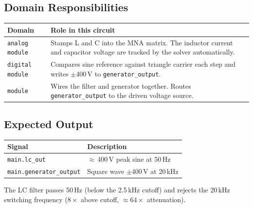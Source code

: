 \documentclass[11pt, a4paper]{article}
\newcommand{\code}[1]{\texttt{\small #1}}
\begin{document}
\subsection*{Domain Responsibilities}

\begin{center}
\begin{tabular}{@{} L{3.5cm} L{9cm} @{}}
  \toprule
  \textbf{Domain} & \textbf{Role in this circuit} \\
  \midrule
  \code{analog module}  & Stamps L and C into the MNA matrix. The
                          inductor current and capacitor voltage are
                          tracked by the solver automatically. \\
  \code{digital module} & Compares sine reference against triangle
                          carrier each step and writes $\pm$400\,V to
                          \code{generator\_output}. \\
  \code{module}         & Wires the filter and generator together.
                          Routes \code{generator\_output} to the driven
                          voltage source. \\
  \bottomrule
\end{tabular}
\end{center}

\subsection*{Expected Output}

\begin{center}
\begin{tabular}{@{} L{4.5cm} L{8cm} @{}}
  \toprule
  \textbf{Signal} & \textbf{Description} \\
  \midrule
  \code{main.lc\_out}           & $\approx$\,400\,V peak sine at 50\,Hz \\
  \code{main.generator\_output} & Square wave $\pm$400\,V at 20\,kHz \\
  \bottomrule
\end{tabular}
\end{center}

The LC filter passes 50\,Hz (below the 2.5\,kHz cutoff) and rejects the
20\,kHz switching frequency ($8\times$ above cutoff,
${\approx}64\times$ attenuation).
\end{document}
